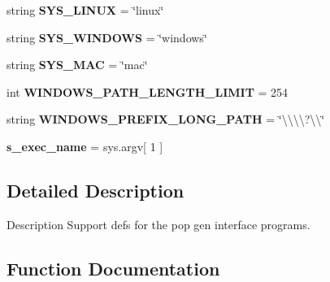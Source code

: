 \begin{DoxyCompactItemize}
\item 
string {\bfseries S\+Y\+S\+\_\+\+L\+I\+N\+UX} = \char`\"{}linux\char`\"{}\hypertarget{namespacenegui_1_1pgutilities_aeccb8b0b17c7d891838cba42245af21f}{}\label{namespacenegui_1_1pgutilities_aeccb8b0b17c7d891838cba42245af21f}

\item 
string {\bfseries S\+Y\+S\+\_\+\+W\+I\+N\+D\+O\+WS} = \char`\"{}windows\char`\"{}\hypertarget{namespacenegui_1_1pgutilities_a1b63e58ac56fd9c130d038961d9d3f99}{}\label{namespacenegui_1_1pgutilities_a1b63e58ac56fd9c130d038961d9d3f99}

\item 
string {\bfseries S\+Y\+S\+\_\+\+M\+AC} = \char`\"{}mac\char`\"{}\hypertarget{namespacenegui_1_1pgutilities_a7013b038174112cd25916bc2b4e9736d}{}\label{namespacenegui_1_1pgutilities_a7013b038174112cd25916bc2b4e9736d}

\item 
int {\bfseries W\+I\+N\+D\+O\+W\+S\+\_\+\+P\+A\+T\+H\+\_\+\+L\+E\+N\+G\+T\+H\+\_\+\+L\+I\+M\+IT} = 254\hypertarget{namespacenegui_1_1pgutilities_aa4190f0e10fcd1e2e65a9100ab1f272e}{}\label{namespacenegui_1_1pgutilities_aa4190f0e10fcd1e2e65a9100ab1f272e}

\item 
string {\bfseries W\+I\+N\+D\+O\+W\+S\+\_\+\+P\+R\+E\+F\+I\+X\+\_\+\+L\+O\+N\+G\+\_\+\+P\+A\+TH} = \char`\"{}\textbackslash{}\textbackslash{}\textbackslash{}\textbackslash{}?\textbackslash{}\textbackslash{}\char`\"{}\hypertarget{namespacenegui_1_1pgutilities_a203fe75d04eb61f090b8a13a28633481}{}\label{namespacenegui_1_1pgutilities_a203fe75d04eb61f090b8a13a28633481}

\item 
{\bfseries s\+\_\+exec\+\_\+name} = sys.\+argv\mbox{[} 1 \mbox{]}\hypertarget{namespacenegui_1_1pgutilities_a25b185def2c6bb2698b1927b4a20a904}{}\label{namespacenegui_1_1pgutilities_a25b185def2c6bb2698b1927b4a20a904}

\end{DoxyCompactItemize}


\subsection{Detailed Description}
\begin{DoxyVerb}Description
Support defs for the pop gen interface programs.
\end{DoxyVerb}
 

\subsection{Function Documentation}
